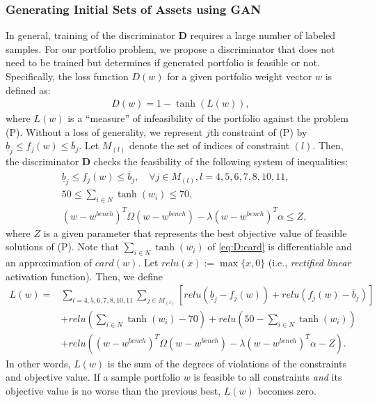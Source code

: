\documentclass[11pt]{article}
\begin{document}
\subsubsection{Generating Initial Sets of Assets using GAN}

In general, training of the discriminator \textbf{D} requires a large number of labeled samples. For our portfolio problem, we propose a discriminator that does not need to be trained but determines if generated portfolio is feasible or not. 
Specifically, the loss function $D(w)$ for a given portfolio weight vector $w$ is defined as:
\begin{align}
D(w) = 1 - \tanh(L(w)),
\end{align}
where $L(w)$ is a ``measure'' of infeasibility of the portfolio against the problem (P). Without a loss of generality, we represent $j$th constraint of (P) by $\underline{b}_j \le f_j (w) \le \overline{b}_j$. Let $M_{(l)}$ denote the set of indices of constraint $(l)$. Then, the discriminator \textbf{D} checks the feasibility of the following system of inequalities:
\begin{align}
& \underline{b}_j \le f_j (w) \le \overline{b}_j, \quad \forall j \in M_{(l)}, l = 4,5,6,7,8,10,11,\\
& 50 \le \sum_{i \in N} \tanh (w_i) \le 70, \label{eq:D:card} \\
& (w-w^{bench})^T \Omega (w-w^{bench}) - \lambda (w-w^{bench})^T \alpha \le Z, \label{eq:D:obj}
\end{align}
where $Z$ is a given parameter that represents the best objective value of feasible solutions of (P). Note that $\sum_{i \in N} \tanh (w_i)$ of \eqref{eq:D:card} is differentiable and an approximation of $card(w)$. Let $relu(x) := \max \{x,0\}$ (i.e., \emph{rectified linear} activation function). Then, we define
\begin{align*}
L(w) =& \sum_{l =4,5,6,7,8,10,11} \sum_{j \in M_{(l)}} \left[ relu( \underline{b}_j - f_j (w) ) + relu( f_j (w) - \overline{b}_j ) \right]\\
&+ relu\left(\sum_{i \in N} \tanh (w_i) - 70 \right) + relu\left(50 - \sum_{i \in N} \tanh (w_i) \right)\\
&+ relu\left((w-w^{bench})^T \Omega (w-w^{bench}) - \lambda (w-w^{bench})^T \alpha - Z \right).
\end{align*}
In other words, $L(w)$ is the sum of the degrees of violations of the constraints and objective value. If a sample portfolio $w$ is feasible to all constraints \emph{and} its objective value is no worse than the previous best, $L(w)$ becomes zero. 
\end{document}

